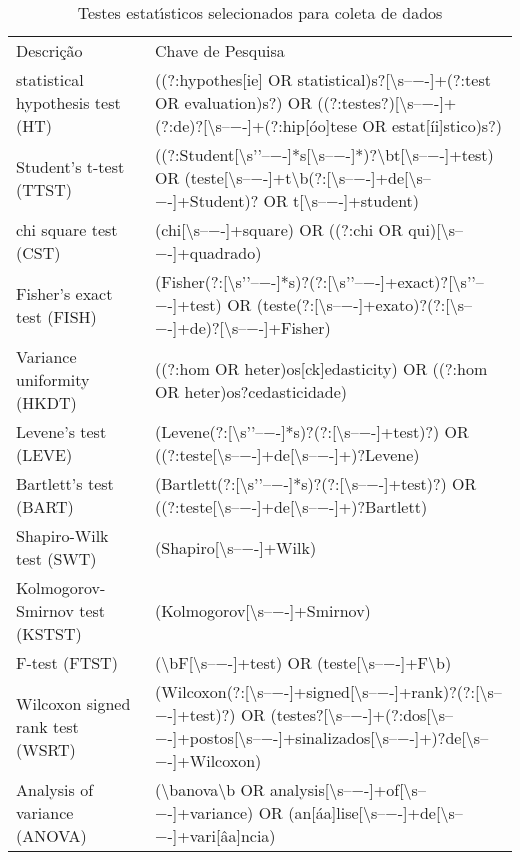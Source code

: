 \begin{table}
\caption{Testes estatı́sticos selecionados para coleta de dados}
\begin{tabular}{ll}
Descrição & Chave de Pesquisa \\
statistical hypothesis test (HT) & ((?:hypothes[ie] OR statistical)s?[\textbackslash s–−-]+(?:test OR evaluation)s?) OR ((?:testes?)[\textbackslash s–−-]+(?:de)?[\textbackslash s–−-]+(?:hip[óo]tese OR estat[íi]stico)s?) \\
Student's t-test (TTST) & ((?:Student[\textbackslash s'’–−-]*s[\textbackslash s–−-]*)?\textbackslash bt[\textbackslash s–−-]+test) OR (teste[\textbackslash s–−-]+t\textbackslash b(?:[\textbackslash s–−-]+de[\textbackslash s–−-]+Student)? OR t[\textbackslash s–−-]+student) \\
chi square test (CST) & (chi[\textbackslash s–−-]+square) OR ((?:chi OR qui)[\textbackslash s–−-]+quadrado) \\
Fisher's exact test (FISH) & (Fisher(?:[\textbackslash s'’–−-]*s)?(?:[\textbackslash s'’–−-]+exact)?[\textbackslash s'’–−-]+test) OR (teste(?:[\textbackslash s–−-]+exato)?(?:[\textbackslash s–−-]+de)?[\textbackslash s–−-]+Fisher) \\
Variance uniformity (HKDT) & ((?:hom OR heter)os[ck]edasticity) OR ((?:hom OR heter)os?cedasticidade) \\
Levene's test (LEVE) & (Levene(?:[\textbackslash s'’–−-]*s)?(?:[\textbackslash s–−-]+test)?) OR ((?:teste[\textbackslash s–−-]+de[\textbackslash s–−-]+)?Levene) \\
Bartlett's test (BART) & (Bartlett(?:[\textbackslash s'’–−-]*s)?(?:[\textbackslash s–−-]+test)?) OR ((?:teste[\textbackslash s–−-]+de[\textbackslash s–−-]+)?Bartlett) \\
Shapiro-Wilk test (SWT) & (Shapiro[\textbackslash s–−-]+Wilk) \\
Kolmogorov-Smirnov test (KSTST) & (Kolmogorov[\textbackslash s–−-]+Smirnov) \\
F-test (FTST) & (\textbackslash bF[\textbackslash s–−-]+test) OR (teste[\textbackslash s–−-]+F\textbackslash b) \\
Wilcoxon signed rank test (WSRT) & (Wilcoxon(?:[\textbackslash s–−-]+signed[\textbackslash s–−-]+rank)?(?:[\textbackslash s–−-]+test)?) OR (testes?[\textbackslash s–−-]+(?:dos[\textbackslash s–−-]+postos[\textbackslash s–−-]+sinalizados[\textbackslash s–−-]+)?de[\textbackslash s–−-]+Wilcoxon) \\
Analysis of variance (ANOVA) & (\textbackslash banova\textbackslash b OR analysis[\textbackslash s–−-]+of[\textbackslash s–−-]+variance) OR (an[áa]lise[\textbackslash s–−-]+de[\textbackslash s–−-]+vari[âa]ncia) \\

\end{tabular}
\end{table}
